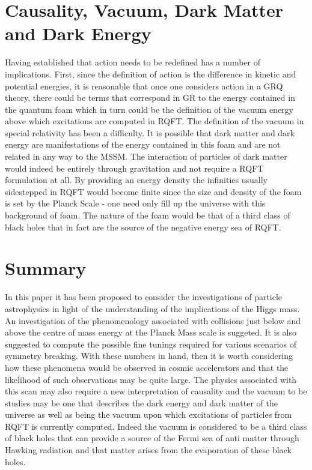 \documentclass[a4paper]{article}
\begin{document}
\section{Causality, Vacuum, Dark Matter and Dark Energy}
\label{sec:causality}
Having established that action needs to be redefined has a number of implications.  First, since the definition
of action is the difference in kinetic and potential energies, it is reasonable that once one considers action
in a GRQ theory, there could be terms that correspond in GR to the energy contained in the quantum foam which
in turn could be the definition of the vacuum energy above which excitations are computed in RQFT. The definition
of the vacuum in special relativity has been a difficulty. It is possible that dark matter and dark energy
are manifestations of the energy contained in this foam and are not related in any way to the MSSM. The 
interaction of particles of dark matter would indeed be entirely through gravitation and not require 
a RQFT formulation at all. By providing an energy density the infinities usually sidestepped in RQFT would
become finite since the size and density of the foam is set by the Planck Scale - one need only fill up the
universe with this background of foam.  The nature of the foam would be that of a third class of black holes that
in fact are the source of the negative energy sea of RQFT.  

\section{Summary}
In this paper it has been proposed to consider the investigations of particle astrophysics in light of 
the understanding of the implications of the Higgs mass.  An investigation of the phenomenology 
associated with collisions just below and above the centre of mass energy at the Planck Mass scale is 
suggeted.  It is also suggested to compute the possible fine tunings required for various scenarios 
of symmetry breaking.  With these numbers in hand, then it is worth considering how these phenomena would
be observed in cosmic accelerators and that the likelihood of such observations may be quite large.
The physics associated with this scan may also require a new interpretation of causality and the
vacuum to be studies may be one that describes the dark energy and dark matter of the universe as well
as being the vacuum upon which excitations of particles from RQFT is currently computed. Indeed the vacuum
is considered to be a third class of black holes that can provide a source of the Fermi sea of anti matter
through Hawking radiation and that matter arises from the evaporation of these black holes.  
\end{document}
